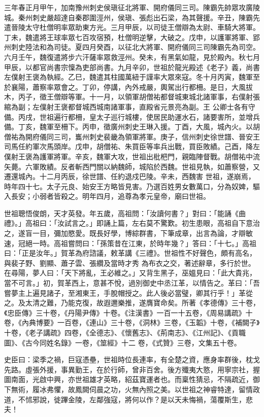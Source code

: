 \begin{pinyinscope}
 三年春正月甲午，加南豫州刺史侯瑱征北將軍、開府儀同三司。陳霸先帥眾攻廣陵城。秦州刺史嚴超達自秦郡圍涇州，侯瑱、張彪出石梁，為其聲援。辛丑，陳霸先遣晉陵太守杜僧明率眾助東方光。三月甲辰，以司徒王僧辯為太尉、車騎大將軍。丁未，魏遣將王球率眾七百攻宿預，杜僧明逆擊，大破之。戊申，以護軍將軍、郢
 州刺史陸法和為司徒。夏四月癸酉，以征北大將軍、開府儀同三司陳霸先為司空。六月壬午，魏復遣將步六汗薩率眾救涇州。癸未，有黑氣如龍，見於殿內。秋七月甲辰，以都官尚書宗懍為吏部尚書。九月辛卯，世祖於龍光殿述《老子》義，尚書左僕射王褒為執經。乙巳，魏遣其柱國萬紐于謹率大眾來寇。冬十月丙寅，魏軍至於襄陽，蕭察率眾會之。丁卯，停講，內外戒嚴，輿駕出行都柵。是日，大風拔木，丙子，徵王僧辯等軍。十一月，以領軍胡僧祐都督城東城北諸軍事，右僕射張綰為副；左僕射王褒都督城西城南諸軍事，直殿省元景亮為副。王
 公卿士各有守備。丙戌，世祖遍行都柵，皇太子巡行城樓，使居民助運水石，諸要害所，並增兵備。丁亥，魏軍至柵下。丙申，徵廣州刺史王琳入援。丁酉，大風，城內火。以胡僧祐為開府儀同三司，巂州刺史裴畿為領軍將軍。庚子，信州刺史徐世譜、晉安王司馬任約軍次馬頭岸。戊申，胡僧祐、朱買臣等率兵出戰，買臣敗績。己酉，降左僕射王褒為護軍將軍。辛亥，魏軍大攻，世祖出枇杷門，親臨陣督戰。胡僧祐中流矢薨。六軍敗績。反者斬西門關以納魏師，城陷於西魏。世祖見執，如蕭察營，又遷還城內。十二月丙辰，徐世譜、任約退戍巴陵。辛未，西魏害
 世祖，遂崩焉，時年四十七。太子元良、始安王方略皆見害。乃選百姓男女數萬口，分為奴婢，驅入長安；小弱者皆殺之。明年四月，追尊為孝元皇帝，廟曰世祖。



 世祖聰悟俊朗，天才英發。年五歲，高祖問：「汝讀何書？」對曰：「能誦《曲禮》。」高祖曰：「汝試言之。」即誦上篇，左右莫不驚歎。初生患眼，高祖自下意治之，遂盲一目，彌加愍愛。既長好學，博綜群書，下筆成章，出言為論，才辯敏速，冠絕一時。高祖嘗問曰：「孫策昔在江東，於時年幾？」答曰：「十七。」高祖曰：「正是汝年。」賀革為府諮議，敕革講《三禮》。世祖性不好聲色，頗有高名，與裴子野、劉顯、蕭子雲、張纘及當時才秀
 為布衣之交，著述辭章，多行於世。在尋陽，夢人曰：「天下將亂，王必維之。」又背生黑子，巫媼見曰：「此大貴兆，當不可言。」初，賀革西上，意甚不悅，過別御史中丞江革，以情告之。革曰：「吾嘗夢主上遍見諸子，至湘東王，手脫帽授之。此人後必當璧，卿其行乎！」革從之。及太清之難，乃能克復，故遐邇樂推，遂膺寶命矣。所著《孝德傳》三十卷，《忠臣傳》三十卷，《丹陽尹傳》十卷。《注漢書》一百一十五卷，《周易講疏》十卷，《內典博要》一百卷，《連山》三十卷，《洞林》三卷，《玉韜》十卷，《補闕子》十卷，《老子講疏》四卷，《全德志》、《懷舊志》、《荊南志》、《江州記》、《貢職圖》、《古今同姓名錄》一卷，《筮經》十二
 卷，《式贊》三卷，文集五十卷。



 史臣曰：梁季之禍，巨寇憑壘，世祖時位長連率，有全楚之資，應身率群後，枕戈先路。虛張外援，事異勤王，在於行師，曾非百舍。後方殲夷大憝，用寧宗社，握圖南面，光啟中興，亦世祖雄才英略，紹茲寶運者也。而稟性猜忌，不隔疏近，御下無術，履冰弗懼，故鳳闕伺晨之功，火無內照之美。以世祖之神睿特達，留情政道，不怵邪說，徙蹕金陵，左鄰強寇，將何以作？是以天未悔禍，蕩覆斯生，悲夫！



\end{pinyinscope}